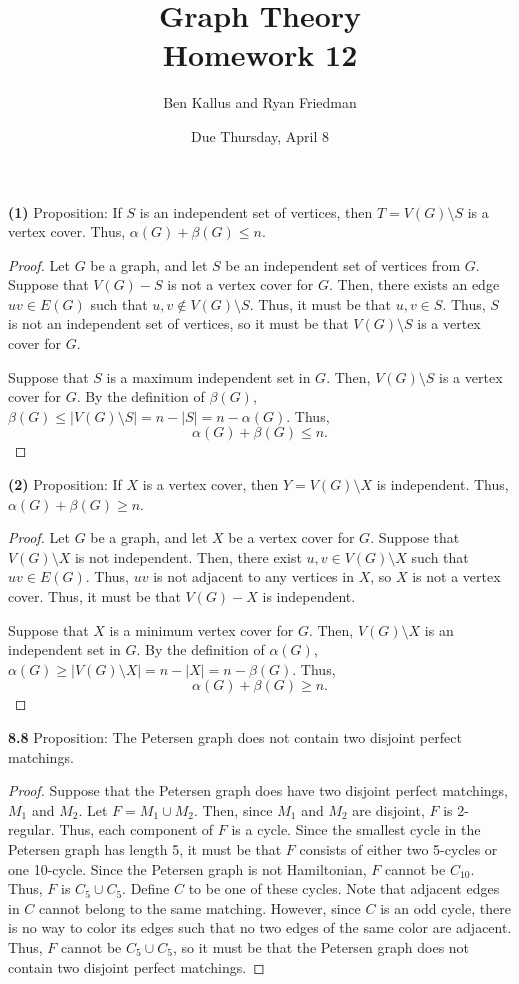 \documentclass[12pt]{article}
\title{Graph Theory \\ Homework 12}
\author{Ben Kallus and Ryan Friedman}
\date{Due Thursday, April 8}
\begin{document}
\maketitle

\medskip\noindent\textbf{(1)} Proposition: If $S$ is an independent set of vertices, then $T = V(G) \setminus S$ is a vertex cover. Thus, $\alpha(G) + \beta(G) \leq n$.
\begin{proof}
    Let $G$ be a graph, and let $S$ be an independent set of vertices from $G$.
    Suppose that $V(G) - S$ is not a vertex cover for $G$.
    Then, there exists an edge $uv \in E(G)$ such that $u,v\notin V(G) \setminus S$. 
    Thus, it must be that $u,v \in S$.
    Thus, $S$ is not an independent set of vertices, so it must be that $V(G) \setminus S$ is a vertex cover for $G$.

    Suppose that $S$ is a maximum independent set in $G$.
    Then, $V(G) \setminus S$ is a vertex cover for $G$.
    By the definition of $\beta(G)$, $\beta(G) \leq |V(G) \setminus S| = n - |S| = n - \alpha(G)$.
    Thus, $$\alpha(G) + \beta(G) \leq n.$$
\end{proof}

\medskip\noindent\textbf{(2)} Proposition: If $X$ is a vertex cover, then $Y=V(G) \setminus X$ is independent. Thus, $\alpha(G) + \beta(G) \geq n$.
\begin{proof}
    Let $G$ be a graph, and let $X$ be a vertex cover for $G$.
    Suppose that $V(G) \setminus X$ is not independent.
    Then, there exist $u,v \in V(G) \setminus X$ such that $uv \in E(G)$.
    Thus, $uv$ is not adjacent to any vertices in $X$, so $X$ is not a vertex cover.
    Thus, it must be that $V(G) - X$ is independent.

    Suppose that $X$ is a minimum vertex cover for $G$.
    Then, $V(G) \setminus X$ is an independent set in $G$.
    By the definition of $\alpha(G)$, $\alpha(G) \geq |V(G) \setminus X| = n - |X| = n - \beta(G)$.
    Thus, $$\alpha(G) + \beta(G) \geq n.$$
\end{proof}
    
\newpage\noindent\textbf{8.8} Proposition: The Petersen graph does not contain two disjoint perfect matchings.
\begin{proof}
    Suppose that the Petersen graph does have two disjoint perfect matchings, $M_1$ and $M_2$.
    Let $F = M_1 \cup M_2$.
    Then, since $M_1$ and $M_2$ are disjoint, $F$ is 2-regular.
    Thus, each component of $F$ is a cycle.
    Since the smallest cycle in the Petersen graph has length 5, it must be that $F$ consists of either two 5-cycles or one 10-cycle.
    Since the Petersen graph is not Hamiltonian, $F$ cannot be $C_10$.
    Thus, $F$ is $C_5 \cup C_5$.
    Define $C$ to be one of these cycles.
    Note that adjacent edges in $C$ cannot belong to the same matching.
    However, since $C$ is an odd cycle, there is no way to color its edges such that no two edges of the same color are adjacent.
    Thus, $F$ cannot be $C_5 \cup C_5$, so it must be that the Petersen graph does not contain two disjoint perfect matchings.
\end{proof}
\end{document}

